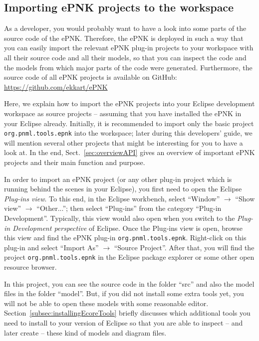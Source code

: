 \subsection{Importing ePNK projects to the workspace}
\label{sec:dev:import-ePNK}

As a developer, you would probably want to have a look into some parts of
the source code of the ePNK. Therefore, the ePNK is deployed in such a way
that you can easily import the relevant ePNK plug-in projects to your
workspace with all their source code and all their models, so that you
can inspect the code and the models from which major parts of the code
were generated. Furthermore, the source code of all ePNK projects is
available on GitHub: \url{https://github.com/ekkart/ePNK}

Here, we explain how to import the ePNK projects into your Eclipse development
workspace as source projects -- assuming that you have installed the ePNK
in your Eclipse already. Initially, it is recommended to import
only the basic project {\tt org.pnml.tools.epnk} into the workspace;
later during this developers' guide, we will mention several other
projects that might be interesting for you to have a look at. In
the end, Sect.~\ref{sec:overviewAPI} gives an overview of important
ePNK projects and their main function and purpose.

In order to import an ePNK project (or any other plug-in project which
is running behind the scenes in your Eclipse), you first need to open the Eclipse
\emph{Plug-ins view}.%
To this end, in the Eclipse workbench, select ``Window'' $\rightarrow$ ``Show
view''  $\rightarrow$ ``Other...''; then select ``Plug-ins'' from the
category ``Plug-in Development''. Typically, this view would also open
when you switch to the \emph{Plug-in Development perspective}%
of Eclipse.
Once the Plug-ins view is open, browse this view and find the ePNK
plug-in {\tt org.pnml.tools.epnk}. Right-click on this plug-in and
select ``Import As'' $\rightarrow$ ``Source Project''. After that,
you will find the project  {\tt org.pnml.tools.epnk} in the Eclipse
package explorer or some other open resource browser.

In this project, you can see the source code in the folder ``src'' and
also the model files in the folder ``model''. But, if you did not install some extra tools
yet, you will not be able to open these models with some
reasonable editor. Section~\ref{subsec:installingEcoreTools}
briefly discusses which additional tools you need to install to your version
of Eclipse so that you are able to inspect -- and later create -- 
these kind of models and diagram files.

